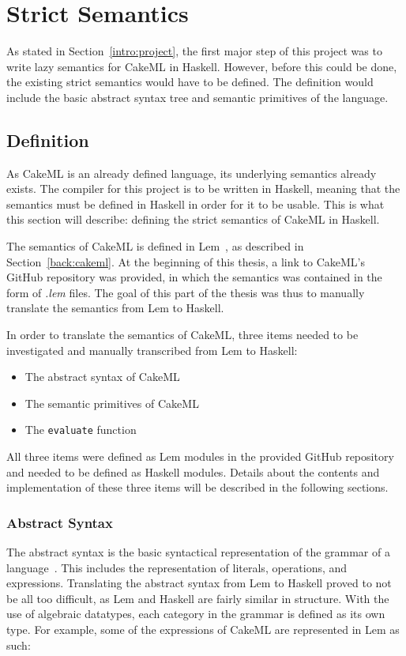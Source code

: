 \chapter{Strict Semantics}
\label{chapter:strict}
As stated in Section~\ref{intro:project}, the first major step of this project
was to write lazy semantics for CakeML in Haskell. However, before this could be
done, the existing strict semantics would have to be defined. The definition
would include the basic abstract syntax tree and semantic primitives of the
language.

\section{Definition}
As CakeML is an already defined language, its underlying semantics already
exists. The compiler for this project is to be written in Haskell, meaning that
the semantics must be defined in Haskell in order for it to be usable. This is
what this section will describe: defining the strict semantics of CakeML in
Haskell.

The semantics of CakeML is defined in Lem~\cite{Lem33:online}, as described in
Section~\ref{back:cakeml}. At the beginning of this thesis, a link to CakeML's
GitHub repository was provided, in which the semantics was contained in the form
of \textit{.lem} files. The goal of this part of the thesis was thus to manually
translate the semantics from Lem to Haskell.

In order to translate the semantics of CakeML, three items needed to be
investigated and manually transcribed from Lem to Haskell:
\begin{itemize}
\item The abstract syntax of CakeML
\item The semantic primitives of CakeML
\item The \texttt{evaluate} function
\end{itemize}

\noindent All three items were defined as Lem modules in the provided GitHub
repository and needed to be defined as Haskell modules.
Details about the contents and implementation of these three items
will be described in the following sections.

\subsection{Abstract Syntax}
\label{strict:abs}
The abstract syntax is the basic syntactical representation of the grammar of a
language~\cite{pltbook}. This includes the representation of literals,
operations, and expressions. Translating the abstract syntax from Lem to Haskell
proved to not be all too difficult, as Lem and Haskell are fairly similar in
structure. With the use of algebraic datatypes, each category in the grammar is
defined as its own type. For example, some of the expressions of CakeML
are represented in Lem as such:

